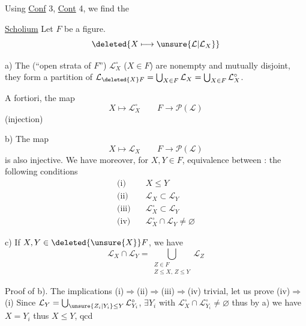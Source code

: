  Using \uline{Conf} 3, \uline{Cont} 4, we find the

\uline{Scholium} Let $F$  be a figure. 
\[
\deleted{X\longmapsto\unsure{\mathcal{L}|\mathcal{L}_X}}
\]

a) The   (``open strata of $F$'') $\mathcal{L}_X^{\circ}$ ($X\in F$) are nonempty and mutually disjoint, they form  a partition of $\mathcal{L}_{\deleted{X}F}=\bigcup_{X\in F}\mathcal{L}_X=\bigcup_{X\in F}\mathcal{L}_X^{\circ}$.

 A fortiori, the map
\[
 X\longmapsto \mathcal{L}_X^{\circ}\qquad F\longrightarrow\mathcal P(\mathcal{L})
\]
(injection)

b) The map
\[
 X\longmapsto \mathcal{L}_X\qquad F\longrightarrow\mathcal P(\mathcal{L})
\]
is also injective. \inserted{[thus if $X,Y$ are compatible and $\mathcal{L}_X=\mathcal{L}_Y$ we have $X=Y$)} We have moreover, for $X,Y\in F$, equivalence between : the following conditions
\[
\begin{aligned}
 \text{(i)}\quad &X\leq Y\\
 \text{(ii)}\quad &\mathcal{L}_X\subset \mathcal{L}_Y\\
 \text{(iii)}\quad &\mathcal{L}_X^{\circ}\subset \mathcal{L}_Y\\
 \text{(iv)}\quad &\mathcal{L}_X^{\circ}\cap \mathcal{L}_Y\ne\varnothing
\end{aligned}
\]

c) If $X,Y\in\deleted{\unsure{X}}F$, we have
\[
 \mathcal{L}_X\cap \mathcal{L}_Y=\bigcup_{\substack{Z\in F\\ Z\leq X,\,Z\leq Y}}\mathcal{L}_Z
\]

Proof of b). The implications (i)$\Rightarrow$(ii)$\Rightarrow$(iii)$\Rightarrow$(iv) trivial, let us prove (iv)$\Rightarrow$(i) Since $\mathcal{L}_Y=\bigcup_{\unsure{Z_i|Y_i}\leq Y} \mathcal{L}_{Y_i}^{\circ}$,  $\exists Y_i$ with $\mathcal{L}_X^{\circ}\cap \mathcal{L}_{Y_i}^{\circ}\ne\varnothing$ thus by a) we have $X=Y_i$ thus $X\leq Y$, qcd

